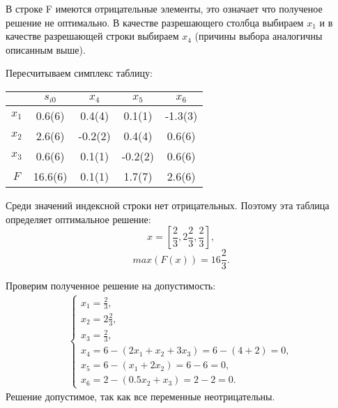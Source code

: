 \documentclass[12pt,a4paper,oneside]{extarticle}
\begin{document}
    В строке F имеются отрицательные элементы, это означает что полученое решение не оптимально.
    В качестве разрешающего столбца выбираем $x_1$ и в качестве разрешающей строки выбираем $x_4$ (причины выбора аналогичны описанным выше).

    Пересчитываем симплекс таблицу:
    \begin{center}
        \begin{tabular}{|c|c|c|c|c|}
            \hline
                 & $s_{i0}$ & $x_4$ & $x_5$ & $x_6$ \\ \hline
            $x_1$ & 0.6(6)    &0.4(4) & 0.1(1)  & -1.3(3) \\ \hline
            $x_2$ & 2.6(6)    & -0.2(2) & 0.4(4)  & 0.6(6) \\ \hline
            $x_3$ & 0.6(6)    & 0.1(1)  & -0.2(2) & 0.6(6) \\ \hline
            $F$   & 16.6(6)   & 0.1(1)  & 1.7(7)  & 2.6(6) \\ \hline
        \end{tabular}
    \end{center}

    Среди значений индексной строки нет отрицательных. Поэтому эта таблица определяет оптимальное решение:
    $$x = [\frac{2}{3}, 2\frac{2}{3}, \frac{2}{3}],$$ 
    $$max(F(x)) = 16\frac{2}{3}.$$

    Проверим полученное решение на допустимость:
    \begin{gather}
        \begin{cases}
            x_1 = \frac{2}{3},\\
            x_2 = 2\frac{2}{3}, \\
            x_3 = \frac{2}{3}, \\
            x_4 = 6 - (2x_1 + x_2 + 3x_3) = 6 - (4 + 2)=0, \\
            x_5 = 6 - (x_1 + 2x_2) = 6 - 6 = 0,\\
            x_6 = 2 - (0.5x_2 + x_3) = 2 - 2= 0.
        \end{cases} 
    \end{gather}
    Решение допустимое, так как все переменные неотрицательны.
\end{document}
